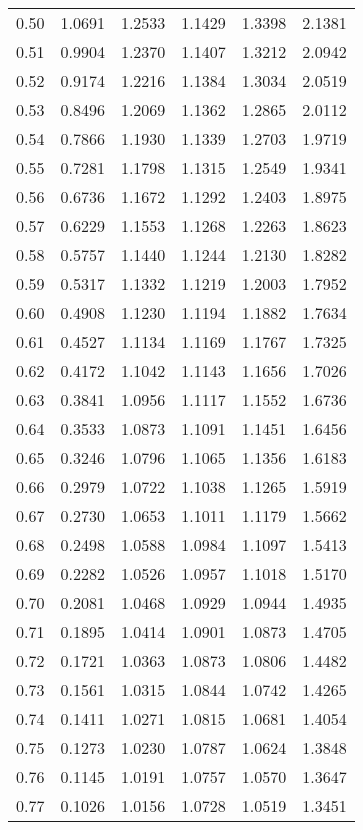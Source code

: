 \documentclass{article}
\begin{document}
\begin{longtable}{cccccc}
0.50 & 1.0691 & 1.2533 & 1.1429 & 1.3398 & 2.1381 \\
0.51 & 0.9904 & 1.2370 & 1.1407 & 1.3212 & 2.0942 \\
0.52 & 0.9174 & 1.2216 & 1.1384 & 1.3034 & 2.0519 \\
0.53 & 0.8496 & 1.2069 & 1.1362 & 1.2865 & 2.0112 \\
0.54 & 0.7866 & 1.1930 & 1.1339 & 1.2703 & 1.9719 \\
0.55 & 0.7281 & 1.1798 & 1.1315 & 1.2549 & 1.9341 \\
0.56 & 0.6736 & 1.1672 & 1.1292 & 1.2403 & 1.8975 \\
0.57 & 0.6229 & 1.1553 & 1.1268 & 1.2263 & 1.8623 \\
0.58 & 0.5757 & 1.1440 & 1.1244 & 1.2130 & 1.8282 \\
0.59 & 0.5317 & 1.1332 & 1.1219 & 1.2003 & 1.7952 \\
0.60 & 0.4908 & 1.1230 & 1.1194 & 1.1882 & 1.7634 \\
0.61 & 0.4527 & 1.1134 & 1.1169 & 1.1767 & 1.7325 \\
0.62 & 0.4172 & 1.1042 & 1.1143 & 1.1656 & 1.7026 \\
0.63 & 0.3841 & 1.0956 & 1.1117 & 1.1552 & 1.6736 \\
0.64 & 0.3533 & 1.0873 & 1.1091 & 1.1451 & 1.6456 \\
0.65 & 0.3246 & 1.0796 & 1.1065 & 1.1356 & 1.6183 \\
0.66 & 0.2979 & 1.0722 & 1.1038 & 1.1265 & 1.5919 \\
0.67 & 0.2730 & 1.0653 & 1.1011 & 1.1179 & 1.5662 \\
0.68 & 0.2498 & 1.0588 & 1.0984 & 1.1097 & 1.5413 \\
0.69 & 0.2282 & 1.0526 & 1.0957 & 1.1018 & 1.5170 \\
0.70 & 0.2081 & 1.0468 & 1.0929 & 1.0944 & 1.4935 \\
0.71 & 0.1895 & 1.0414 & 1.0901 & 1.0873 & 1.4705 \\
0.72 & 0.1721 & 1.0363 & 1.0873 & 1.0806 & 1.4482 \\
0.73 & 0.1561 & 1.0315 & 1.0844 & 1.0742 & 1.4265 \\
0.74 & 0.1411 & 1.0271 & 1.0815 & 1.0681 & 1.4054 \\
0.75 & 0.1273 & 1.0230 & 1.0787 & 1.0624 & 1.3848 \\
0.76 & 0.1145 & 1.0191 & 1.0757 & 1.0570 & 1.3647 \\
0.77 & 0.1026 & 1.0156 & 1.0728 & 1.0519 & 1.3451 \\

\end{longtable}
\end{document}
